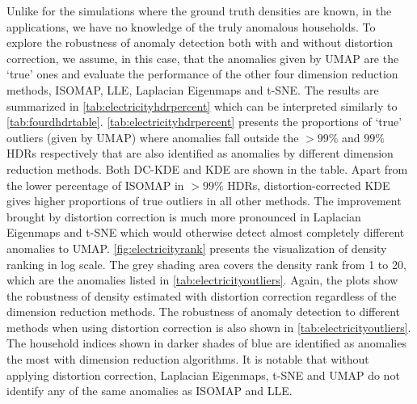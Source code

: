 \documentclass[
]{article}
\begin{document}
Unlike for the simulations where the ground truth densities are known,
in the applications, we have no knowledge of the truly anomalous
households. To explore the robustness of anomaly detection both with and
without distortion correction, we assume, in this case, that the
anomalies given by UMAP are the `true' ones and evaluate the performance
of the other four dimension reduction methods, ISOMAP, LLE, Laplacian
Eigenmaps and t-SNE. The results are summarized in
\autoref{tab:electricityhdrpercent} which can be interpreted similarly
to \autoref{tab:fourdhdrtable}. \autoref{tab:electricityhdrpercent}
presents the proportions of `true' outliers (given by UMAP) where
anomalies fall outside the \(>99\%\) and \(99\%\) HDRs respectively that
are also identified as anomalies by different dimension reduction
methods. Both DC-KDE and KDE are shown in the table. Apart from the
lower percentage of ISOMAP in \(>99\%\) HDRs, distortion-corrected KDE
gives higher proportions of true outliers in all other methods. The
improvement brought by distortion correction is much more pronounced in
Laplacian Eigenmaps and t-SNE which would otherwise detect almost
completely different anomalies to UMAP. \autoref{fig:electricityrank}
presents the visualization of density ranking in log scale. The grey
shading area covers the density rank from 1 to 20, which are the
anomalies listed in \autoref{tab:electricityoutliers}. Again, the plots
show the robustness of density estimated with distortion correction
regardless of the dimension reduction methods. The robustness of anomaly
detection to different methods when using distortion correction is also
shown in \autoref{tab:electricityoutliers}. The household indices shown
in darker shades of blue are identified as anomalies the most with
dimension reduction algorithms. It is notable that without applying
distortion correction, Laplacian Eigenmaps, t-SNE and UMAP do not
identify any of the same anomalies as ISOMAP and LLE.
\end{document}
